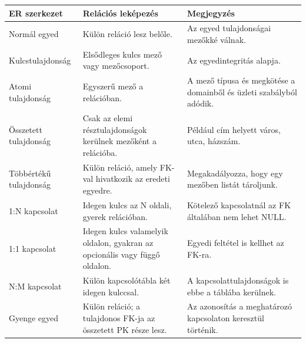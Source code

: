 \begin{tabularx}{\textwidth}{L{35mm}X X}
\toprule
\textbf{ER szerkezet} & \textbf{Relációs leképezés} & \textbf{Megjegyzés} \\
\midrule
Normál egyed & Külön reláció lesz belőle. & Az egyed tulajdonságai mezőkké válnak. \\
Kulcstulajdonság & Elsődleges kulcs mező vagy mezőcsoport. & Az egyedintegritás alapja. \\
Atomi tulajdonság & Egyszerű mező a relációban. & A mező típusa és megkötése a domainből és üzleti szabályból adódik. \\
Összetett tulajdonság & Csak az elemi résztulajdonságok kerülnek mezőként a relációba. & Például cím helyett város, utca, házszám. \\
Többértékű tulajdonság & Külön reláció, amely FK-val hivatkozik az eredeti egyedre. & Megakadályozza, hogy egy mezőben listát tároljunk. \\
1:N kapcsolat & Idegen kulcs az N oldali, gyerek relációban. & Kötelező kapcsolatnál az FK általában nem lehet NULL. \\
1:1 kapcsolat & Idegen kulcs valamelyik oldalon, gyakran az opcionális vagy függő oldalon. & Egyedi feltétel is kellhet az FK-ra. \\
N:M kapcsolat & Külön kapcsolótábla két idegen kulccsal. & A kapcsolattulajdonságok is ebbe a táblába kerülnek. \\
Gyenge egyed & Külön reláció; a tulajdonos FK-ja az összetett PK része lesz. & Az azonosítás a meghatározó kapcsolaton keresztül történik. \\
\bottomrule
\end{tabularx}
